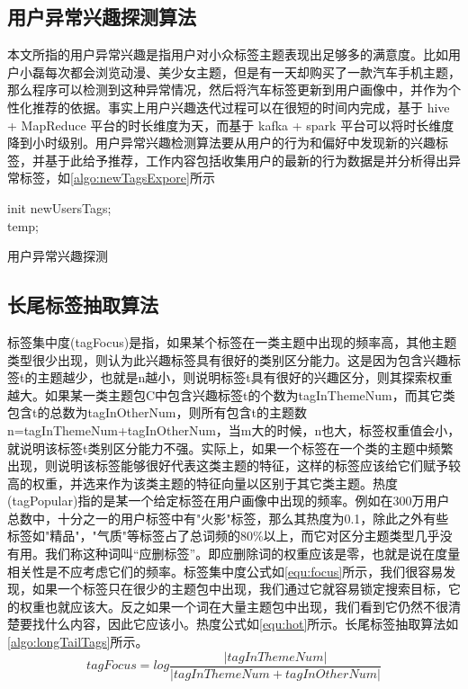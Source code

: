   \subsection{用户异常兴趣探测算法}
  本文所指的用户异常兴趣是指用户对小众标签主题表现出足够多的满意度。比如用户小磊每次都会浏览动漫、美少女主题，但是有一天却购买了一款汽车手机主题，那么程序可以检测到这种异常情况，然后将汽车标签更新到用户画像中，并作为个性化推荐的依据。事实上用户兴趣迭代过程可以在很短的时间内完成，基于 hive + MapReduce 平台的时长维度为天，而基于 kafka + spark 平台可以将时长维度降到小时级别。用户异常兴趣检测算法要从用户的行为和偏好中发现新的兴趣标签，并基于此给予推荐，工作内容包括收集用户的最新的行为数据是并分析得出异常标签，如\autoref{algo:newTagsExpore}所示
  \begin{algorithm}
  init newUsersTags;\\
  \Return temp;
  \caption{用户异常兴趣探测}
  \label{algo:newTagsExpore}
  \end{algorithm}

  \subsection{长尾标签抽取算法}
  标签集中度(tagFocus)是指，如果某个标签在一类主题中出现的频率高，其他主题类型很少出现，则认为此兴趣标签具有很好的类别区分能力。这是因为包含兴趣标签t的主题越少，也就是n越小，则说明标签t具有很好的兴趣区分，则其探索权重越大。如果某一类主题包C中包含兴趣标签t的个数为tagInThemeNum，而其它类包含t的总数为tagInOtherNum，则所有包含t的主题数n=tagInThemeNum+tagInOtherNum，当m大的时候，n也大，标签权重值会小，就说明该标签t类别区分能力不强。实际上，如果一个标签在一个类的主题中频繁出现，则说明该标签能够很好代表这类主题的特征，这样的标签应该给它们赋予较高的权重，并选来作为该类主题的特征向量以区别于其它类主题。热度(tagPopular)指的是某一个给定标签在用户画像中出现的频率。例如在300万用户总数中，十分之一的用户标签中有"火影"标签，那么其热度为0.1，除此之外有些标签如"精品"，"气质"等标签占了总词频的80\%以上，而它对区分主题类型几乎没有用。我们称这种词叫“应删标签”。即应删除词的权重应该是零，也就是说在度量相关性是不应考虑它们的频率。标签集中度公式如\autoref{equ:focus}所示，我们很容易发现，如果一个标签只在很少的主题包中出现，我们通过它就容易锁定搜索目标，它的权重也就应该大。反之如果一个词在大量主题包中出现，我们看到它仍然不很清楚要找什么内容，因此它应该小。热度公式如\autoref{equ:hot}所示。长尾标签抽取算法如\autoref{algo:longTailTags}所示。
    \begin{equation}
      tagFocus=log\frac{|tagInThemeNum|}{|tagInThemeNum+tagInOtherNum|}
      \label{equ:focus}
    \end{equation}

